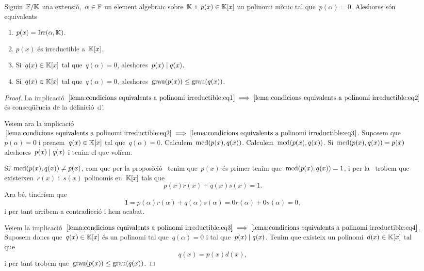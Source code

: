 \documentclass[../Apunts.tex]{subfiles}
\begin{document}
	\begin{lemma}
		\label{lema:condicions equivalents a polinomi irreductible}
		Siguin~\(\mathbb{F}/\mathbb{K}\) una extensió,~\(\alpha\in\mathbb{F}\) un element algebraic sobre~\(\mathbb{K}\) i~\(p(x)\in\mathbb{K}[x]\) un polinomi mònic tal que~\(p(\alpha)=0\). Aleshores són equivalents
		\begin{enumerate}
		\item\label{lema:condicions equivalents a polinomi irreductible:eq1} \(p(x)=\operatorname{Irr}(\alpha,\mathbb{K})\).
		\item\label{lema:condicions equivalents a polinomi irreductible:eq2} \(p(x)\) és irreductible a~\(\mathbb{K}[x]\).
		\item\label{lema:condicions equivalents a polinomi irreductible:eq3} Si~\(q(x)\in\mathbb{K}[x]\) tal que~\(q(\alpha)=0\), aleshores~\(p(x)\mathrel{|} q(x)\).
		\item\label{lema:condicions equivalents a polinomi irreductible:eq4} Si~\(q(x)\in\mathbb{K}[x]\) tal que~\(q(\alpha)=0\), aleshores~\(\operatorname{grau}(p(x))\leq\operatorname{grau}(q(x))\).
		\end{enumerate}
		\begin{proof}
			La implicació~\(\eqref{lema:condicions equivalents a polinomi irreductible:eq1}\implies\eqref{lema:condicions equivalents a polinomi irreductible:eq2}\) és conseqüència de la definició~d'.
			
			Veiem ara la implicació~\(\eqref{lema:condicions equivalents a polinomi irreductible:eq2}\implies\eqref{lema:condicions equivalents a polinomi irreductible:eq3}\). Suposem que~\(p(\alpha)=0\) i prenem~\(q(x)\in\mathbb{K}[x]\) tal que~\(q(\alpha)=0\). Calculem~\(\operatorname{mcd}(p(x),q(x))\). Calculem~\(\operatorname{mcd}(p(x),q(x))\). Si~\(\operatorname{mcd}(p(x),q(x))=p(x)\) aleshores~\(p(x)\mathrel{|} q(x)\) i tenim el que volíem.
			
			Si~\(\operatorname{mcd}(p(x),q(x))\neq p(x)\), com que per la proposició~ tenim que~\(p(x)\) és primer tenim que~\(\operatorname{mcd}(p(x),q(x))=1\), i per la~ trobem que existeixen~\(r(x)\) i~\(s(x)\) polinomis en~\(\mathbb{K}[x]\) tals que
			\[p(x)r(x)+q(x)s(x)=1.\]
			Ara bé, tindríem que
			\[
				1=p(\alpha)r(\alpha)+q(\alpha)s(\alpha)=0r(\alpha)+0s(\alpha)=0,
			\]
			i per tant arribem a contradicció i hem acabat.
			
			Veiem la implicació~\(\eqref{lema:condicions equivalents a polinomi irreductible:eq3}\implies\eqref{lema:condicions equivalents a polinomi irreductible:eq4}\). Suposem doncs que~\(q(x)\in\mathbb{K}[x]\) és un polinomi tal que~\(q(\alpha)=0\) i tal que~\(p(x)\mathrel{|} q(x)\). Tenim que existeix un polinomi~\(d(x)\in\mathbb{K}[x]\) tal que
			\[q(x)=p(x)d(x),\]
			i per tant trobem que~\(\operatorname{grau}(p(x))\leq\operatorname{grau}(q(x))\).
			

\end{proof}
\end{lemma}
\end{document}
